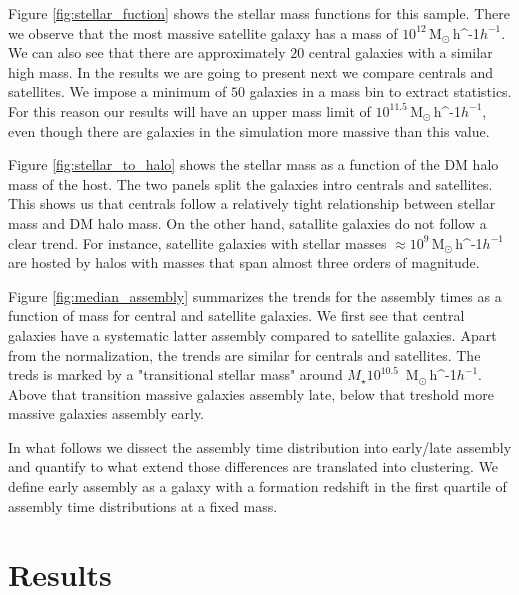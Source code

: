 \documentclass[fleqn,usenatbib]{mnras}
\newcommand{\Msunh}{\,{\rm M}$_{\odot}$\,\ifmmode h^{-1}\else $h^{-1}$\fi}
\begin{document}
Figure \ref{fig:stellar_fuction} shows the stellar mass functions for
this sample.
There we observe that the most massive satellite galaxy has a
mass of $10^{12}$\Msunh.  
We can also see that there are approximately $20$ central galaxies
with a similar high mass. 
In the results we are going to present next we compare centrals and
satellites. 
We impose a  minimum of $50$ galaxies in a mass bin to extract statistics. 
For this reason our results will have an upper mass limit of
$10^{11.5}$\Msunh, even though there are galaxies in the simulation
more massive than this value.

Figure \ref{fig:stellar_to_halo} shows the stellar mass as a function
of the DM halo mass of the host.
The two panels split the galaxies intro centrals and satellites. 
This shows us that centrals follow a relatively tight relationship
between stellar mass and DM halo mass.
On the other hand, satallite galaxies do not follow a clear trend.
For instance, satellite galaxies with stellar masses $\approx
10^{9}$\Msunh are hosted by halos with masses that span almost three
orders of magnitude.

Figure \ref{fig:median_assembly} summarizes the trends for the
assembly times as a function of mass for central and satellite
galaxies.
We first see that central galaxies have a systematic latter assembly
compared to satellite galaxies.
Apart from the normalization, the trends are similar for centrals and
satellites.
The treds is marked by a "transitional stellar mass" around $M_\star
10^{10.5}$ \Msunh.
Above that transition massive galaxies assembly late, below that
treshold more massive galaxies assembly early.

In what follows we dissect the assembly time distribution into
early/late assembly and quantify to what extend those differences are
translated into clustering.
We define early assembly as a galaxy with a formation redshift in the
first quartile of assembly time distributions at a fixed mass.


\section{Results}
\label{sec:galactic_prop}
\end{document}
